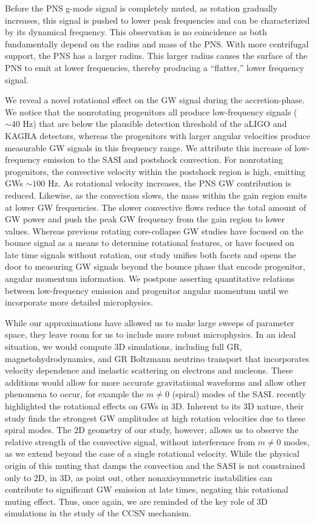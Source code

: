 \documentclass[twocolumn,times]{aastex62}  %
\begin{document}
Before the PNS g-mode signal is completely muted, as rotation gradually increases, this signal is pushed to lower peak frequencies and can be characterized by its dynamical frequency.  This observation is no coincidence as both  fundamentally depend on the radius and mass of the PNS.  With more centrifugal support, the PNS has a larger radius.  This larger radius causes the surface of the PNS to emit at lower frequencies, thereby producing a ``flatter,'' lower frequency signal.

We reveal a novel rotational effect on the GW signal during the accretion-phase.  We notice that the nonrotating progenitors all produce low-frequency signals ($\sim 40$ Hz) that are below the plausible detection threshold of the aLIGO and KAGRA detectors, whereas the progenitors with larger angular velocities produce measurable GW signals in this frequency range.  We attribute this increase of low-frequency emission to the SASI and postshock convection.  For nonrotating progenitors, the convective velocity within the postshock region is high, emitting GWs $\sim 100$ Hz.  As rotational velocity increases, the PNS GW contribution is reduced.  Likewise, as the convection slows, the mass within the gain region emits at lower GW frequencies.  The slower convective flows reduce the total amount of GW power and push the peak GW frequency from the gain region to lower values.  Whereas previous rotating core-collapse GW studies have focused on the bounce signal as a means to determine rotational features, or have focused on late time signals without rotation, our study unifies both facets and opens the door to measuring GW signals beyond the bounce phase that encode progenitor, angular momentum information. 
We postpone asserting quantitative relations between low-frequency emission and progenitor angular momentum until we incorporate more detailed microphysics.


While our approximations have allowed us to make large sweeps of parameter space, they leave room for us to include more robust microphysics.  In an ideal situation, we would compute 3D simulations, including full GR, magnetohydrodynamics, and GR Boltzmann neutrino transport that incorporates velocity dependence and inelastic scattering on electrons and nucleons.  These additions would allow for more accurate gravitational waveforms and allow other phenomena to occur, for example the $m\ne 0$ (spiral) modes of the SASI. \citet{andresen:2019} recently highlighted the rotational effects on GWs in 3D.  Inherent to its 3D nature, their study finds the strongest GW amplitudes at high rotation velocities due to these spiral modes.  The 2D geometry of our study, however, allows us to observe the relative strength of the convective signal, without interference from $m\ne 0$ modes, as we extend beyond the case of a single rotational velocity.
While the physical origin of this muting that damps the convection and the SASI is not constrained only to 2D, in 3D, as \citet{andresen:2019} point out, other nonaxisymmetric instabilities can contribute to significant GW emission at late times, negating this rotational muting effect.
Thus, once again, we are reminded of the key role of 3D simulations in the study of the CCSN mechanism.
\end{document}
